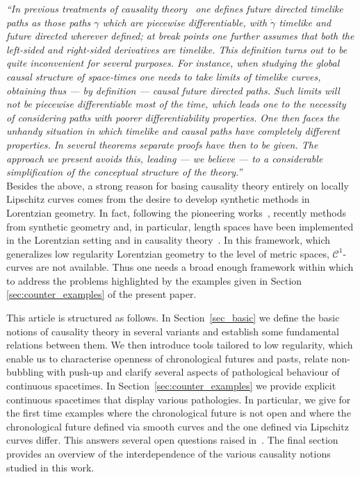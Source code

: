 \documentclass[reqno]{amsart}
\numberwithin{equation}{section}
\theoremstyle{plain}
\theoremstyle{definition}
\theoremstyle{remark}
\begin{document}
{\it ``In previous treatments of causality theory~\cite{BEE:96,Ger:70,HE:73,ONe:83,Pen:72b,Wal:84} one defines future
directed timelike paths as those paths $\gamma$ which are piecewise differentiable, with $\dot\gamma$ timelike and future 
directed wherever defined; at break points one further assumes that both the left-sided and right-sided derivatives are 
timelike. This definition turns out to be quite inconvenient for several purposes. For instance, when studying
the global causal structure of space-times one needs to take limits of timelike curves,
obtaining thus --- by definition --- causal future directed paths. Such limits will
not be piecewise differentiable most of the time, which leads one to the necessity
of considering paths with poorer differentiability properties. One then faces the
unhandy situation in which timelike and causal paths have completely different
properties. In several theorems separate proofs have then to be given. The approach
we present avoids this, leading --- we believe --- to a considerable simplification of
the conceptual structure of the theory.''}\\

Besides the above, a strong reason for basing causality theory entirely on
locally Lipschitz curves comes from the desire to develop synthetic methods
in Lorentzian geometry. In fact,
following the pioneering works~\cite{Har:82,AB:08}, recently methods from synthetic geometry and, in particular, length spaces have been implemented in the 
Lorentzian setting and in causality theory~\cite{KS:18,GKS:18}. In this framework, which generalizes low regularity 
Lorentzian geometry to the level of metric spaces, $\mathcal{C}^1$-curves are not available. Thus one needs a broad enough framework within which to address the problems highlighted by the examples given
in Section \ref{sec:counter_examples} of the present paper.


This article is structured as follows. In Section~\ref{sec_basic} we define the basic notions of causality theory in several 
variants and establish some fundamental relations between them. We then introduce tools tailored to low regularity, which  enable us to characterise openness of chronological futures and pasts, 
relate non-bubbling with push-up 
and clarify several aspects of pathological behaviour of continuous spacetimes. In Section~\ref{sec:counter_examples} we provide explicit continuous spacetimes that display various pathologies. In particular, we 
give for the first time examples where the chronological future is not open and where the chronological future defined via 
smooth curves and the one defined via Lipschitz curves differ. This answers several open questions raised in~\cite{CG:12}. The final section provides an overview of the interdependence of the
various causality notions studied in this work.
\end{document}
